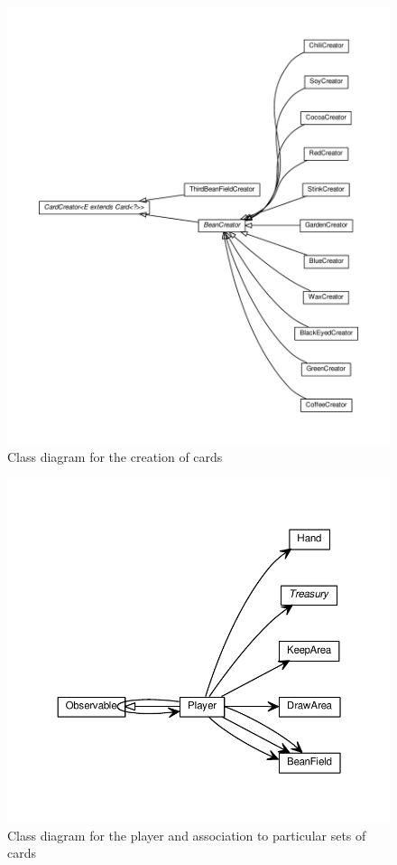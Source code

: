 \begin{figure}[h!]
    \includegraphics[width=\textwidth]{../umlgraph/CreatorGraph}
    \caption{Class diagram for the creation of cards}
    \label{fig:design:cards}
\end{figure}

\begin{figure}[h!] 
    \includegraphics[width=\textwidth]{../umlgraph/PlayerGraph}
    \caption{Class diagram for the player and association to particular sets of cards}
    \label{fig:design:cards}
\end{figure}

